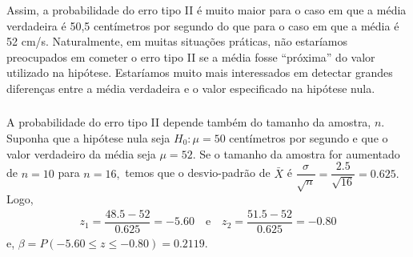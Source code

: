 \documentclass[14pt,aspectratio=1610]{beamer}
\newcommand{\Ho}{\ensuremath{H_{0}}}
\begin{document}
\begin{frame}{}
\begin{center}
\end{center}
\end{frame}

\begin{frame}{}
\frametitle{}
\begin{block}{}
\justifying
Assim, a probabilidade do erro tipo II é muito maior para o caso em que a média verdadeira é 50,5 centímetros por segundo do que para o caso em que a média é 
52 cm/s. Naturalmente, em muitas situações práticas, não estaríamos preocupados em cometer o erro tipo II se a média fosse “próxima” do valor utilizado na hipótese. 
Estaríamos muito mais interessados em detectar grandes diferenças entre a média verdadeira e o valor especificado na hipótese nula.
\end{block}
\end{frame}

\begin{frame}{}
\frametitle{}
\begin{block}{}
\justifying
A probabilidade do erro tipo II depende também do tamanho da amostra, $n.$ Suponha que a hipótese nula seja $\Ho: \mu = 50$ centímetros por segundo e que o valor 
verdadeiro da média seja $\mu = 52.$ Se o tamanho da amostra for aumentado de $n = 10$ para $n = 16,$ temos que o desvio-padrão de $\bar{X}$ é 
$\dfrac{\sigma}{\sqrt{n}}=\dfrac{2.5}{\sqrt{16}}=0.625.$ Logo,
\begin{align*}
z_{1}=\dfrac{48.5-52}{0.625}=-5.60\quad \textrm{e}\quad z_{2}=\dfrac{51.5-52}{0.625}=-0.80
\end{align*}
e, $\beta=P(-5.60\leq z\leq-0.80)=0.2119.$
\end{block}
\end{frame}
\end{document}
